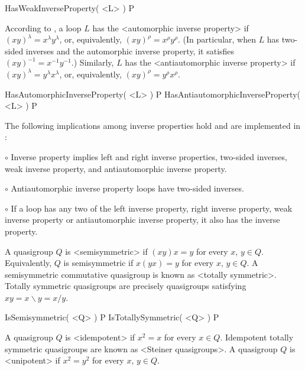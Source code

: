 \>HasWeakInverseProperty( <L> ) P

According to \cite{Ar}, a loop $L$ has the <automorphic inverse
property> if $(xy)^\lambda = x^\lambda
y^\lambda$, or, equivalently, $(xy)^\rho = x^\rho y^\rho$. (In particular, when
$L$ has two-sided inverses and the automorphic inverse property, it satisfies
$(xy)^{-1}=x^{-1}y^{-1}$.) Similarly, $L$ has the <antiautomorphic inverse
property> if $(xy)^\lambda=y^\lambda
x^\lambda$, or, equivalently, $(xy)^\rho = y^\rho x^\rho$.

\>HasAutomorphicInverseProperty( <L> ) P
\>HasAntiautomorphicInverseProperty( <L> ) P

The following implications among inverse properties hold and are
implemented in {\LOOPS}:
\beginlist%
\item{$\circ$}
    Inverse property implies left and right inverse properties,
    two-sided inverses, weak inverse property, and antiautomorphic
    inverse property.
\item{$\circ$}
    Antiautomorphic inverse property loops have two-sided inverses.
\item{$\circ$}
    If a loop has any two of the left inverse property, right inverse property,
    weak inverse property or antiautomorphic inverse property, it also has
    the inverse property.
\endlist


A quasigroup $Q$ is <semisymmetric> if $(xy)x=y$ for every $x$, $y\in
Q$. Equivalently, $Q$ is semisymmetric if $x(yx)=y$ for every $x$, $y\in Q$. A
semisymmetric commutative quasigroup is known as <totally
symmetric>. Totally symmetric quasigroups are precisely quasigroups satisfying
$xy=x\backslash y = x/y$.

\>IsSemisymmetric( <Q> ) P
\>IsTotallySymmetric( <Q> ) P

A quasigroup $Q$ is <idempotent> if $x^2=x$ for every $x\in Q$.
Idempotent totally symmetric quasigroups are known as <Steiner
quasigroups>. A quasigroup
$Q$ is <unipotent> if
$x^2=y^2$ for every $x$, $y\in Q$.

